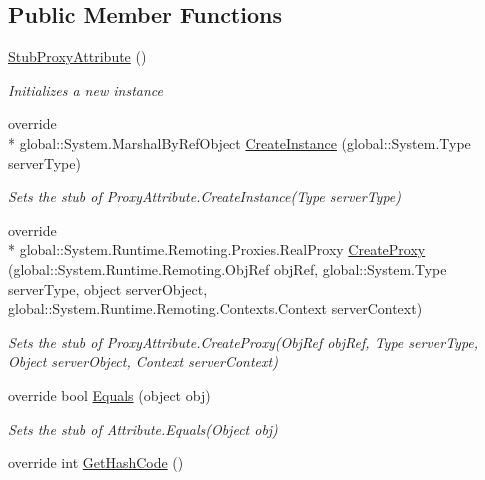 \subsection*{Public Member Functions}
\begin{DoxyCompactItemize}
\item 
\hyperlink{class_system_1_1_runtime_1_1_remoting_1_1_proxies_1_1_fakes_1_1_stub_proxy_attribute_a2bf86dbccddb906d8b501f088f338b2b}{Stub\-Proxy\-Attribute} ()
\begin{DoxyCompactList}\small\item\em Initializes a new instance\end{DoxyCompactList}\item 
override \\*
global\-::\-System.\-Marshal\-By\-Ref\-Object \hyperlink{class_system_1_1_runtime_1_1_remoting_1_1_proxies_1_1_fakes_1_1_stub_proxy_attribute_aa50383655ab65e18cab351ef3e480832}{Create\-Instance} (global\-::\-System.\-Type server\-Type)
\begin{DoxyCompactList}\small\item\em Sets the stub of Proxy\-Attribute.\-Create\-Instance(\-Type server\-Type)\end{DoxyCompactList}\item 
override \\*
global\-::\-System.\-Runtime.\-Remoting.\-Proxies.\-Real\-Proxy \hyperlink{class_system_1_1_runtime_1_1_remoting_1_1_proxies_1_1_fakes_1_1_stub_proxy_attribute_a003399641cbcd4ffdd74dc098c7ecfbb}{Create\-Proxy} (global\-::\-System.\-Runtime.\-Remoting.\-Obj\-Ref obj\-Ref, global\-::\-System.\-Type server\-Type, object server\-Object, global\-::\-System.\-Runtime.\-Remoting.\-Contexts.\-Context server\-Context)
\begin{DoxyCompactList}\small\item\em Sets the stub of Proxy\-Attribute.\-Create\-Proxy(\-Obj\-Ref obj\-Ref, Type server\-Type, Object server\-Object, Context server\-Context)\end{DoxyCompactList}\item 
override bool \hyperlink{class_system_1_1_runtime_1_1_remoting_1_1_proxies_1_1_fakes_1_1_stub_proxy_attribute_aa8c1a01e604e92618744cfc3b5349787}{Equals} (object obj)
\begin{DoxyCompactList}\small\item\em Sets the stub of Attribute.\-Equals(\-Object obj)\end{DoxyCompactList}\item 
override int \hyperlink{class_system_1_1_runtime_1_1_remoting_1_1_proxies_1_1_fakes_1_1_stub_proxy_attribute_a02c52c4d0e53b40efd5fc3507f7bd4bd}{Get\-Hash\-Code} ()

\end{DoxyCompactItemize}
